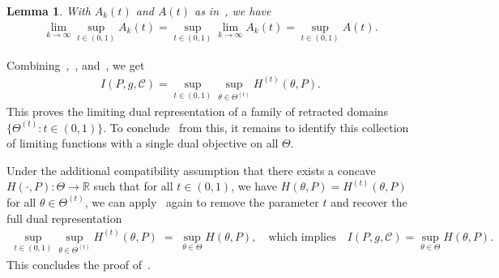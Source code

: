 \documentclass{article}
\theoremstyle{plain}
\newtheorem{lemma}[lemma]{Lemma}
\theoremstyle{definition}
\newcommand{\R}{\mathbb{R}}
\newcommand{\calC}{\mathcal C}
\newcommand{\qtext}[1]{\quad \text{#1} \quad}
\begin{document}
\begin{lemma}
    \label{lemma:approx-constraint-unique-limit}
    With $A_k(t)$ and $A(t)$ as in~, we have 
    \begin{align}
        \lim_{k \to \infty} \sup_{t \in (0,1)} A_k(t) = \sup_{t \in (0,1)} \lim_{k \to \infty}  A_k(t)  =  \sup_{t \in (0,1)} A(t). 
    \end{align}
    
\end{lemma}
Combining~,~, and~, we get 
\begin{align}
    I(P, g, \calC) = \sup_{t \in (0,1)} \sup_{\theta \in \Theta^{(t)}} H^{(t)}(\theta, P). 
\end{align}
This proves the limiting dual representation of a family of retracted domains $\{\Theta^{(t)}: t \in (0,1)\}$. To conclude~ from this, it remains to identify this collection of limiting functions with a single dual objective on all $\Theta$.  
    
Under the additional compatibility assumption that there exists a concave $H(\cdot, P): \Theta \to \R$ such that for all $t \in (0,1)$, we have $H(\theta, P) = H^{(t)}(\theta, P)$ for all $\theta \in \Theta^{(t)}$, we can apply~ again to remove the parameter $t$ and recover the full dual representation 
    \begin{align}
        \sup_{t\in (0, 1)} \sup_{\theta \in \Theta^{(t)}} H^{(t)} (\theta, P) \; = \; \sup_{\theta \in \Theta} H(\theta, P), \qtext{which implies}  I(P, g, \calC) = \sup_{\theta \in \Theta} H(\theta, P). 
    \end{align}
This concludes the proof of~. \hfill \qedsymbol  
\end{document}
